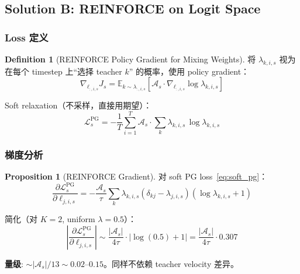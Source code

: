 \documentclass[11pt,a4paper]{article}
\newcommand{\loss}{\mathcal{L}}
\newcommand{\E}{\mathbb{E}}
\newcommand{\adv}{\mathcal{A}}
\theoremstyle{definition}
\newtheorem{definition}{Definition}
\newtheorem{proposition}{Proposition}
\begin{document}
\subsection{Solution B: REINFORCE on Logit Space}

\subsubsection{Loss 定义}

\begin{definition}[REINFORCE Policy Gradient for Mixing Weights]
将 $\lambda_{k,i,s}$ 视为在每个 timestep 上``选择 teacher $k$'' 的概率，使用 policy gradient：
\begin{equation}
\boxed{
\nabla_{\ell_{:,i,s}} J_s = \E_{k \sim \lambda_{:,i,s}}\left[\adv_s \cdot \nabla_{\ell_{:,i,s}} \log \lambda_{k,i,s}\right]
}
\label{eq:reinforce}
\end{equation}

Soft relaxation（不采样，直接用期望）：
\begin{equation}
\loss^{\mathrm{PG}}_s = -\frac{1}{T}\sum_{i=1}^T \adv_s \cdot \sum_k \lambda_{k,i,s}\, \log \lambda_{k,i,s}
\label{eq:soft_pg}
\end{equation}
\end{definition}

\subsubsection{梯度分析}

\begin{proposition}[REINFORCE Gradient]
对 soft PG loss~\eqref{eq:soft_pg}：
\begin{equation}
\frac{\partial \loss^{\mathrm{PG}}_s}{\partial \ell_{j,i,s}} = -\frac{\adv_s}{\tau}\sum_k \lambda_{k,i,s}(\delta_{kj} - \lambda_{j,i,s})(\log\lambda_{k,i,s} + 1)
\label{eq:pg_gradient}
\end{equation}

简化（对 $K=2$, uniform $\lambda = 0.5$）：
\begin{equation}
\left|\frac{\partial \loss^{\mathrm{PG}}_s}{\partial \ell_{j,i,s}}\right| \sim \frac{|\adv_s|}{4\tau} \cdot |\log(0.5) + 1| = \frac{|\adv_s|}{4\tau} \cdot 0.307
\end{equation}

\textbf{量级}: $\sim |\adv_s| / 13 \sim 0.02$--$0.15$。同样不依赖 teacher velocity 差异。
\end{proposition}
\end{document}
